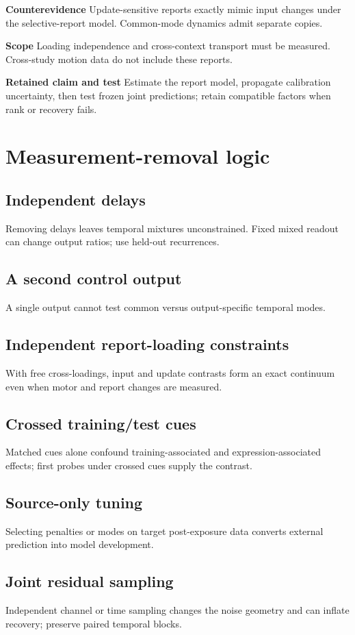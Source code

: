\documentclass[11pt,a4paper]{article}
\begin{document}
\textbf{Counterevidence} Update-sensitive reports exactly mimic input changes under the selective-report model. Common-mode dynamics admit separate copies.\par
\textbf{Scope} Loading independence and cross-context transport must be measured. Cross-study motion data do not include these reports.\par
\textbf{Retained claim and test} Estimate the report model, propagate calibration uncertainty, then test frozen joint predictions; retain compatible factors when rank or recovery fails.\par
\clearpage\section{Measurement-removal logic}
\subsection*{Independent delays}
Removing delays leaves temporal mixtures unconstrained. Fixed mixed readout can change output ratios; use held-out recurrences.

\subsection*{A second control output}
A single output cannot test common versus output-specific temporal modes.

\subsection*{Independent report-loading constraints}
With free cross-loadings, input and update contrasts form an exact continuum even when motor and report changes are measured.

\subsection*{Crossed training/test cues}
Matched cues alone confound training-associated and expression-associated effects; first probes under crossed cues supply the contrast.

\subsection*{Source-only tuning}
Selecting penalties or modes on target post-exposure data converts external prediction into model development.

\subsection*{Joint residual sampling}
Independent channel or time sampling changes the noise geometry and can inflate recovery; preserve paired temporal blocks.
\end{document}
